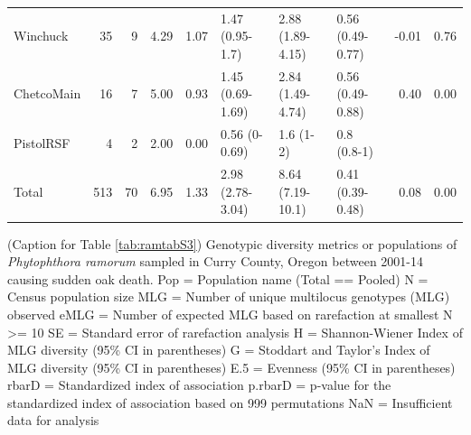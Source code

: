 \documentclass[double,11pt]{beavtex}
\begin{document}
\begin{table}
\begin{tabular}{lrrrrlllrr}
    Winchuck &  35 &   9 & 4.29 & 1.07 & 1.47 (0.95-1.7) & 2.88 (1.89-4.15) & 0.56 (0.49-0.77) & -0.01 & 0.76 \\ 
    ChetcoMain &  16 &   7 & 5.00 & 0.93 & 1.45 (0.69-1.69) & 2.84 (1.49-4.74) & 0.56 (0.49-0.88) & 0.40 & 0.00 \\ 
    PistolRSF &   4 &   2 & 2.00 & 0.00 & 0.56 (0-0.69) & 1.6 (1-2) & 0.8 (0.8-1) &  &  \\ 
    Total & 513 &  70 & 6.95 & 1.33 & 2.98 (2.78-3.04) & 8.64 (7.19-10.1) & 0.41 (0.39-0.48) & 0.08 & 0.00 \\ 
     \bottomrule
  \end{tabular}
  \end{table}
  
  \newpage
  
  \renewcommand{\tablename}{Supplementary Table Caption}
  \renewcommand{\thetable}{\arabic{chapter}.C\arabic{table}}
  
  \addtocounter{table}{-1}
  
  \vspace*{\fill}
  
  \begin{table}[ph!]
  \caption[Caption for Table \ref{tab:ramtabS3}]{(Caption for Table 
  \ref{tab:ramtabS3}) Genotypic diversity metrics or populations of
  \textit{Phytophthora ramorum} sampled in Curry County, Oregon between 2001-14
  causing sudden oak death. Pop = Population name (Total == Pooled)
  N = Census population size
  MLG = Number of unique multilocus genotypes (MLG) observed
  eMLG = Number of expected MLG based on rarefaction at smallest N >= 10
  SE = Standard error of rarefaction analysis
  H = Shannon-Wiener Index of MLG diversity (95\% CI in parentheses)
  G = Stoddart and Taylor's Index of MLG diversity (95\% CI in parentheses)
  E.5 = Evenness (95\% CI in parentheses)
  rbarD = Standardized index of association
  p.rbarD = p-value for the standardized index of association based on 999 permutations
  NaN = Insufficient data for analysis}
  \label{cap:ramcapS3}
  \end{table}\vspace*{\fill}
  
  \renewcommand{\tablename}{Supplementary Table}
  \renewcommand{\thetable}{\arabic{chapter}.S\arabic{table}}
  
  
  \newpage
  
  \renewcommand{\figurename}{Figure}
  \renewcommand{\tablename}{Table}
  \renewcommand{\thefigure}{\arabic{chapter}.\arabic{figure}}
  \renewcommand{\thetable}{\arabic{chapter}.\arabic{table}}
  
\end{document}
